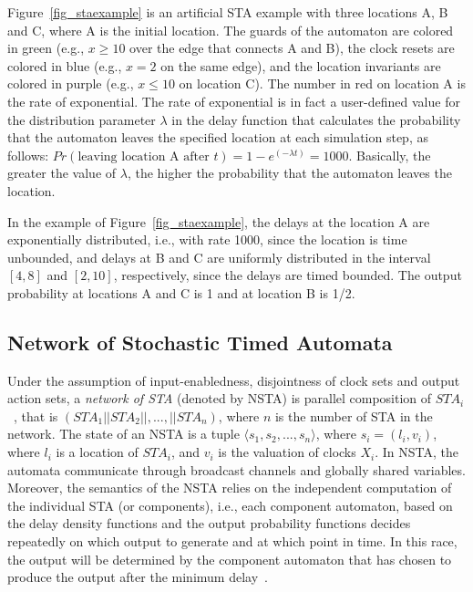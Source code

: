\begin{example} Figure~\ref{fig_staexample} is an artificial STA example with three locations A, B and C, where A is the initial location. The guards of the automaton are colored in green (e.g., $x\geq10$ over the edge that connects A and B), the clock resets are colored in blue (e.g., $x=2$ on the same edge), and the location invariants are colored in purple (e.g., $x\leq 10$ on location C). The number in red on location A is the rate of exponential.
The rate of exponential is in fact a user-defined value for the distribution parameter $\lambda$ in the delay function that calculates the probability that the automaton leaves the specified location at each simulation step, as follows:
$Pr(\mbox{leaving location A after } t) = 1 - e^{(-\lambda t)}  = 1000$. Basically, the greater the value of $\lambda$, the higher the probability that the automaton leaves the location.
\end{example}

In the example of Figure~\ref{fig_staexample}, the delays at the location A are exponentially distributed, i.e., with rate 1000, since the location is time unbounded, and delays at B and C are uniformly distributed in the interval $[4,8]$ and $[2,10]$, respectively, since the delays are timed bounded. The output probability at locations A and C is 1 and at location B is 1/2.

\subsection*{Network of Stochastic Timed Automata}
Under the assumption of input-enabledness, disjointness of clock sets and output action sets, a \textit{network of STA} (denoted by NSTA) is parallel composition of $STA_i$~\cite{David2011StochasticAutomata}, that is $(STA_1||STA_2||,...,||STA_n)$, where $n$ is the number of STA in the network. The state of an NSTA is a tuple $\langle s_1,s_2,...,s_n\rangle$, where $s_i = (l_i, v_i)$, where $l_i$ is a location of $STA_i$, and $v_i$ is the valuation of clocks $X_i$. In NSTA, the automata communicate through broadcast channels and globally shared variables. Moreover, the semantics of the NSTA relies on the independent computation of the individual STA (or components), i.e.,  each component automaton, based on the delay density functions and the output probability functions decides repeatedly on which output to generate and at which point in time. In this race, the output will be determined by the component automaton that has chosen to produce the output after the minimum delay~\cite{David2011StatisticalAutomata}.


